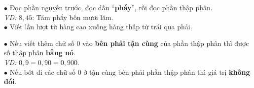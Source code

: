 \documentclass[14pt,a4paper,oneside]{extbook}
\begin{document}
\vspace{3mm}

\noindent
\begin{minipage}[t]{0.50\textwidth}
  \begin{tcolorbox}[
    enhanced,
    title={\footnotesize\bfseries\color{white}\faPencil\ 2. Đọc và viết số thập phân},
    colback=purple!2!white,
    colframe=purple!70!black,
    arc=2.5mm, boxrule=0.8pt, top=1.8mm, bottom=1.8mm, left=2.2mm, right=2.2mm
  ]
    \footnotesize
    $\bullet$ Đọc phần nguyên trước, đọc dấu ``\textbf{phẩy}'', rồi đọc phần thập phân.\\
    \textit{VD:} $8,45$: Tám phẩy bốn mươi lăm.\\
    $\bullet$ Viết lần lượt từ hàng cao xuống hàng thấp từ trái qua phải.
  \end{tcolorbox}
\end{minipage}%
\hfill
\begin{minipage}[t]{0.48\textwidth}
  \begin{tcolorbox}[
    enhanced,
    title={\footnotesize\bfseries\color{white}\faEqual\ 3. Số thập phân bằng nhau},
    colback=orange!2!white,
    colframe=orange!80!black,
    arc=2.5mm, boxrule=0.8pt, top=1.8mm, bottom=1.8mm, left=2mm, right=2mm
  ]
    \footnotesize
    $\bullet$ Nếu viết thêm chữ số $0$ vào \textbf{bên phải tận cùng} của phần thập phân thì được số thập phân \textbf{bằng nó}.\\
    \textit{VD:} $0,9 = 0,90 = 0,900$.\\
    $\bullet$ Nếu bớt đi các chữ số $0$ ở tận cùng bên phải phần thập phân thì giá trị \textbf{không đổi}.
  \end{tcolorbox}
\end{minipage}

\vspace{3mm}
\end{document}
